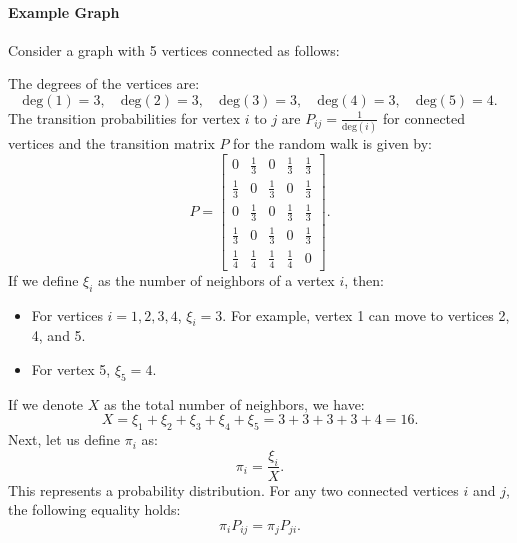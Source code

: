 \paragraph{Example Graph}
Consider a graph with 5 vertices connected as follows:
\begin{center}
\end{center}
The degrees of the vertices are:
\[
\text{deg}(1) = 3, \quad \text{deg}(2) = 3, \quad \text{deg}(3) = 3, \quad \text{deg}(4) = 3, \quad \text{deg}(5) = 4.
\]
The transition probabilities for vertex \( i \) to \( j \) are \( P_{ij} = \frac{1}{\text{deg}(i)} \) for connected vertices and the transition matrix \( P \) for the random walk is given by:
\[
P =
\begin{bmatrix}
0 & \frac{1}{3} & 0 & \frac{1}{3} & \frac{1}{3} \\
\frac{1}{3} & 0 & \frac{1}{3} & 0 & \frac{1}{3} \\
0 & \frac{1}{3} & 0 & \frac{1}{3} & \frac{1}{3} \\
\frac{1}{3} & 0 & \frac{1}{3} & 0 & \frac{1}{3} \\
\frac{1}{4} & \frac{1}{4} & \frac{1}{4} & \frac{1}{4} & 0
\end{bmatrix}.
\]
If we define \(\xi_i\) as the number of neighbors of a vertex \(i\), then:
\begin{itemize}
    \item For vertices \(i = 1, 2, 3, 4\), \(\xi_i = 3\). For example, vertex 1 can move to vertices 2, 4, and 5.
    \item For vertex 5, \(\xi_5 = 4\).
\end{itemize}
If we denote \(X\) as the total number of neighbors, we have:
\[
X = \xi_1 + \xi_2 + \xi_3 + \xi_4 + \xi_5 = 3 + 3 + 3 + 3 + 4 = 16.
\]
Next, let us define \(\pi_i\) as:
\[
\pi_i = \frac{\xi_i}{X}.
\]
This represents a probability distribution. For any two connected vertices \(i\) and \(j\), the following equality holds:
\[
\pi_i P_{ij} = \pi_j P_{ji}.
\]
